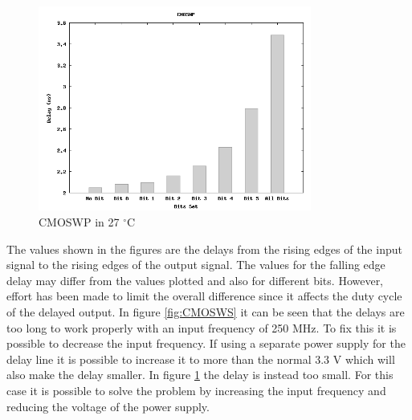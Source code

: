 \documentclass[a4paper,12pt]{article} \usepackage{graphicx}
\newcommand{\degree}{\ensuremath{^\circ}}
\begin{document}
\begin{figure}[h!]
        \centering
        \includegraphics[width=0.8\textwidth]{../Bilder/Delay_Line/CMOSWP.png}
        \caption{CMOSWP in 27 \degree C}
        \label{fig:CMOSWP}
\end{figure}

The values shown in the figures are the
delays from the rising edges of the input signal to the rising edges of the
output signal. The values for the falling edge delay may differ from the values
plotted and also for different bits. However, effort has been made to limit the
overall difference since it affects the duty cycle of the delayed output. 
In figure \ref{fig:CMOSWS} it can be seen that the delays are too long to work
properly with an input frequency of 250 MHz. To fix this it is possible to
decrease the input frequency. If using a separate power supply for the delay
line it is possible to increase it to more than the normal 3.3 V which will
also make the delay smaller. In figure \ref{fig:CMOSWP} the delay is instead too
small. For this case it is possible to solve the problem by increasing the input
frequency and reducing the voltage of the power supply.
\end{document}
